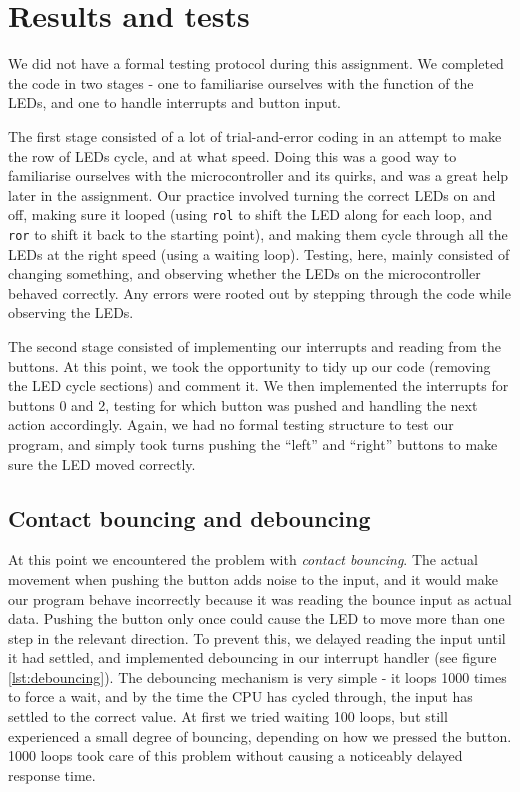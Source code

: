 \section{Results and tests}
We did not have a formal testing protocol during this assignment. We completed the code in two stages - one to familiarise ourselves with the function of the LEDs, and one to handle interrupts and button input. 

The first stage consisted of a lot of trial-and-error coding in an attempt to make the row of LEDs cycle, and at what speed. Doing this was a good way to familiarise ourselves with the microcontroller and its quirks, and was a great help later in the assignment. Our practice involved turning the correct LEDs on and off, making sure it looped (using \texttt{rol} to shift the LED along for each loop, and \texttt{ror} to shift it back to the starting point), and making them cycle through all the LEDs at the right speed (using a waiting loop). Testing, here, mainly consisted of changing something, and observing whether the LEDs on the microcontroller behaved correctly. Any errors were rooted out by stepping through the code while observing the LEDs.

The second stage consisted of implementing our interrupts and reading from the buttons. At this point, we took the opportunity to tidy up our code (removing the LED cycle sections) and comment it. We then implemented the interrupts for buttons 0 and 2, testing for which button was pushed and handling the next action accordingly. Again, we had no formal testing structure to test our program, and simply took turns pushing the ``left'' and ``right'' buttons to make sure the LED moved correctly. 

\subsection{Contact bouncing and debouncing}
At this point we encountered the problem with {\em contact bouncing}. The actual movement when pushing the button adds noise to the input, and it would make our program behave incorrectly because it was reading the bounce input as actual data. Pushing the button only once could cause the LED to move more than one step in the relevant direction. To prevent this, we delayed reading the input until it had settled, and implemented debouncing in our interrupt handler (see figure \ref{lst:debouncing}). The debouncing mechanism is very simple - it loops 1000 times to force a wait, and by the time the CPU has cycled through, the input has settled to the correct value. At first we tried waiting 100 loops, but still experienced a small degree of bouncing, depending on how we pressed the button. 1000 loops took care of this problem without causing a noticeably delayed response time.

